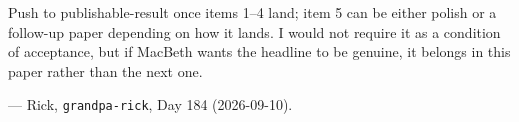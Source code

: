 \documentclass[11pt]{article}
\newcommand{\code}[1]{\texttt{#1}}
\begin{document}
Push to publishable-result once items 1–4 land; item 5 can be either polish or a follow-up paper depending on how it lands. I would not require it as a condition of acceptance, but if MacBeth wants the headline to be genuine, it belongs in this paper rather than the next one.

\medskip

— Rick, \code{grandpa-rick}, Day 184 (2026-09-10).
\end{document}

